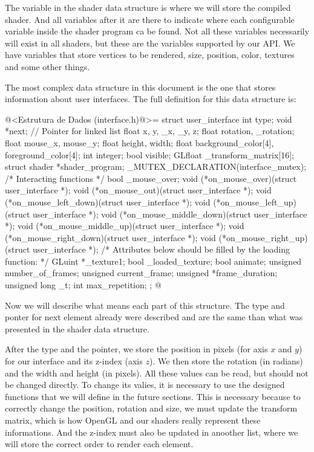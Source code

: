 The variable  in the shader data structure is
where we will store the compiled shader. And all variables after it
are there to indicate where each configurable variable inside the
shader program ca be found. Not all these variables necessarily will
exist in all shaders, but these are the variables supported by our
API. We have variables that store vertices to be rendered, size,
position, color, textures and some other things.


The most complex data structure in this document is the one that
stores information about user interfaces. The full definition for this
data structure is:

\iniciocodigo
@<Estrutura de Dados (interface.h)@>=
struct user_interface{
  int type;
  void *next; // Pointer for linked list
  float x, y, _x, _y, z;
  float rotation, _rotation;
  float mouse_x, mouse_y;
  float height, width;
  float background_color[4], foreground_color[4];
  int integer;
  bool visible;
  GLfloat _transform_matrix[16];
  struct shader *shader_program;
  _MUTEX_DECLARATION(interface_mutex);
  /* Interacting functions */
  bool _mouse_over;
  void (*on_mouse_over)(struct user_interface *);
  void (*on_mouse_out)(struct user_interface *);
  void (*on_mouse_left_down)(struct user_interface *);
  void (*on_mouse_left_up)(struct user_interface *);
  void (*on_mouse_middle_down)(struct user_interface *);
  void (*on_mouse_middle_up)(struct user_interface *);
  void (*on_mouse_right_down)(struct user_interface *);
  void (*on_mouse_right_up)(struct user_interface *);
  /* Attributes below should be filled by the loading function: */
  GLuint *_texture1;
  bool _loaded_texture;
  bool animate;
  unsigned number_of_frames;
  unsigned current_frame;
  unsigned *frame_duration;
  unsigned long _t;
  int max_repetition;
};
@
\fimcodigo

Now we will describe what means each part of this structure. The type
and ponter for next element already were described and are the same
than what was presented in the shader data structure.

After the type and the pointer, we store the position in pixels (for
axis $x$ and $y$) for our interface and its z-index (axis $z$). We
then store the rotation (in radians) and the width and height (in
pixels). All these values can be read, but should not be changed
directly. To change its valies, it is necessary to use the designed
functions that we will define in the future sections. This is
necessary because to correctly change the position, rotation and size,
we must update the transform matrix, which is how OpenGL and our
shaders really represent these informations. And the z-index must also
be updated in anoother list, where we will store the correct order to
render each element.

